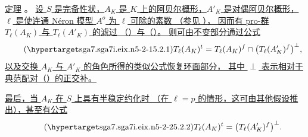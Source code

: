 
%

\medskip
\noindent
\underline{定理} 。
\underline{设 $S$ 是完备性状，$A_K$ 是 $K$ 上的阿贝尔概形，$A'_K$ 是对偶阿贝尔概形，
$\ell$ 是使连通 N\'eron 模型 $A^o$ 为 $\ell$ 可除的素数
（参见 ），
因而有 pro-群 $T_\ell(A_K)$ 与 $T_\ell(A'_K)$ 的滤过
（）与（）。
则可由不变部分通过公式}
\begin{equation}\tag{\SGARefTarget{sga7.sga7i.eix.n5-2-1}{5.2.1}}
 T_\ell(A_K)^t
 =
 T_\ell(A_K)^f\cap\bigl(T_\ell(A'_K)^f\bigr)^\perp,
\end{equation}
\underline{以及交换 $A_K$ 与 $A'_K$ 的角色所得的类似公式恢复环面部分，
其中 $\perp$ 表示相对于典范配对（）的正交补。}

\underline{最后，当 $A_K$ 在 $S$ 上具有半稳定约化时
（在 $\ell=p$ 的情形，这可由其他假设推出），甚至有公式}
\begin{equation}\tag{\SGARefTarget{sga7.sga7i.eix.n5-2-2}{5.2.2}}
 T_\ell(A_K)^t=\bigl(T_\ell(A'_K)^f\bigr)^\perp.
\end{equation}

